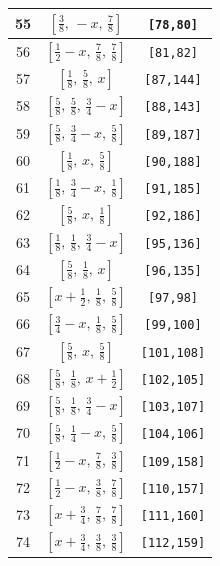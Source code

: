 \documentclass[fleqn,8pt]{jsarticle}
\begin{document}
\begin{longtable}{ccc}
55 & $\left[ \frac{3}{8},\, - x,\, \frac{7}{8} \right]$ & {\tt [78,80]} \\ \hline
56 & $\left[ \frac{1}{2} - x,\, \frac{7}{8},\, \frac{7}{8} \right]$ & {\tt [81,82]} \\ \hline
57 & $\left[ \frac{1}{8},\, \frac{5}{8},\, x \right]$ & {\tt [87,144]} \\ \hline
58 & $\left[ \frac{5}{8},\, \frac{5}{8},\, \frac{3}{4} - x \right]$ & {\tt [88,143]} \\ \hline
59 & $\left[ \frac{5}{8},\, \frac{3}{4} - x,\, \frac{5}{8} \right]$ & {\tt [89,187]} \\ \hline
60 & $\left[ \frac{1}{8},\, x,\, \frac{5}{8} \right]$ & {\tt [90,188]} \\ \hline
61 & $\left[ \frac{1}{8},\, \frac{3}{4} - x,\, \frac{1}{8} \right]$ & {\tt [91,185]} \\ \hline
62 & $\left[ \frac{5}{8},\, x,\, \frac{1}{8} \right]$ & {\tt [92,186]} \\ \hline
63 & $\left[ \frac{1}{8},\, \frac{1}{8},\, \frac{3}{4} - x \right]$ & {\tt [95,136]} \\ \hline
64 & $\left[ \frac{5}{8},\, \frac{1}{8},\, x \right]$ & {\tt [96,135]} \\ \hline
65 & $\left[ x + \frac{1}{2},\, \frac{1}{8},\, \frac{5}{8} \right]$ & {\tt [97,98]} \\ \hline
66 & $\left[ \frac{3}{4} - x,\, \frac{1}{8},\, \frac{5}{8} \right]$ & {\tt [99,100]} \\ \hline
67 & $\left[ \frac{5}{8},\, x,\, \frac{5}{8} \right]$ & {\tt [101,108]} \\ \hline
68 & $\left[ \frac{5}{8},\, \frac{1}{8},\, x + \frac{1}{2} \right]$ & {\tt [102,105]} \\ \hline
69 & $\left[ \frac{5}{8},\, \frac{1}{8},\, \frac{3}{4} - x \right]$ & {\tt [103,107]} \\ \hline
70 & $\left[ \frac{5}{8},\, \frac{1}{4} - x,\, \frac{5}{8} \right]$ & {\tt [104,106]} \\ \hline
71 & $\left[ \frac{1}{2} - x,\, \frac{7}{8},\, \frac{3}{8} \right]$ & {\tt [109,158]} \\ \hline
72 & $\left[ \frac{1}{2} - x,\, \frac{3}{8},\, \frac{7}{8} \right]$ & {\tt [110,157]} \\ \hline
73 & $\left[ x + \frac{3}{4},\, \frac{7}{8},\, \frac{7}{8} \right]$ & {\tt [111,160]} \\ \hline
74 & $\left[ x + \frac{3}{4},\, \frac{3}{8},\, \frac{3}{8} \right]$ & {\tt [112,159]} \\ \hline

\end{longtable}
\end{document}
